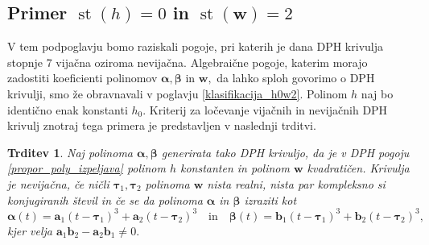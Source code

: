 \documentclass[12pt,a4paper,twoside]{article}
\theoremstyle{definition} %
\theoremstyle{plain} %
\newtheorem{trditev}[definicija]{Trditev}
\theoremstyle{primerstyle}
\numberwithin{equation}{section}  %
\newcommand{\aV}{\mathbf{a}}
\newcommand{\bV}{\mathbf{b}}
\newcommand{\wV}{\mathbf{w}}
\newcommand{\balpha}{\boldsymbol \alpha}
\newcommand{\bbeta}{\boldsymbol \beta}
\newcommand{\btau}{\boldsymbol \tau}
\DeclareMathOperator{\st}{st}
\begin{document}
\subsection{Primer \texorpdfstring{$\st(h)=0$}{st(h)=0} in \texorpdfstring{$\st(\wV)=2$}{st(w)=2}}
\label{locevanje_h0w2}

V tem podpoglavju bomo raziskali pogoje, pri katerih je dana DPH krivulja stopnje 7 vijačna oziroma nevijačna. Algebraične pogoje, katerim morajo zadostiti koeficienti polinomov $\balpha,\bbeta$ in $\wV,$ da lahko sploh govorimo o DPH krivulji, smo že obravnavali v poglavju \ref{klasifikacija_h0w2}. Polinom $h$ naj bo identično enak konstanti $h_0.$ Kriterij za ločevanje vijačnih in nevijačnih DPH krivulj znotraj tega primera je predstavljen v naslednji trditvi.
\begin{trditev}
	\label{locevanje_trditev_h0w2}
	Naj polinoma $\balpha,\bbeta$ generirata tako DPH krivuljo, da je v DPH pogoju \eqref{propor_poly_izpeljava} polinom $h$ konstanten in polinom $\wV$ kvadratičen. Krivulja je nevijačna, če ničli $\btau_1,\btau_2$ polinoma $\wV$ nista realni, nista par kompleksno si konjugiranih števil in če se da polinoma $\balpha$ in $\bbeta$ izraziti kot
	\begin{equation}
		\label{polinoma_h0w2}
		\balpha(t)=\aV_1(t-\btau_1)^3+\aV_2(t-\btau_2)^3\quad\text{in}\quad\bbeta(t)=\bV_1(t-\btau_1)^3+\bV_2(t-\btau_2)^3,
	\end{equation}
	kjer velja $\aV_1\bV_2-\aV_2\bV_1\neq0.$
\end{trditev}
\end{document}

